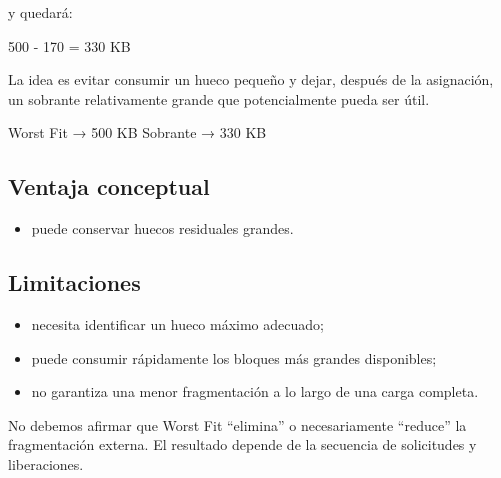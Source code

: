\documentclass[
  spanish,
  letterpaper,
]{scrbook}
\newenvironment{Shaded}{\begin{snugshade}}{\end{snugshade}}
\newcommand{\NormalTok}[1]{\textcolor[rgb]{0.00,0.23,0.31}{#1}}
\providecommand{\tightlist}{%
  \setlength{\itemsep}{0pt}\setlength{\parskip}{0pt}}
\begin{document}
y quedará:

\begin{Shaded}
\begin{Highlighting}[]
\NormalTok{500 {-} 170 = 330 KB}
\end{Highlighting}
\end{Shaded}

La idea es evitar consumir un hueco pequeño y dejar, después de la
asignación, un sobrante relativamente grande que potencialmente pueda
ser útil.

\begin{Shaded}
\begin{Highlighting}[]
\NormalTok{Worst Fit → 500 KB}
\NormalTok{Sobrante  → 330 KB}
\end{Highlighting}
\end{Shaded}

\subsection{Ventaja conceptual}\label{ventaja-conceptual-1}

\begin{itemize}
\tightlist
\item
  puede conservar huecos residuales grandes.
\end{itemize}

\subsection{Limitaciones}\label{limitaciones-4}

\begin{itemize}
\tightlist
\item
  necesita identificar un hueco máximo adecuado;
\item
  puede consumir rápidamente los bloques más grandes disponibles;
\item
  no garantiza una menor fragmentación a lo largo de una carga completa.
\end{itemize}

\begin{tcolorbox}[enhanced jigsaw, arc=.35mm, bottomrule=.15mm, bottomtitle=1mm, breakable, colback=white, colbacktitle=quarto-callout-warning-color!10!white, colframe=quarto-callout-warning-color-frame, coltitle=black, left=2mm, leftrule=.75mm, opacityback=0, opacitybacktitle=0.6, rightrule=.15mm, title=\textcolor{quarto-callout-warning-color}{\faExclamationTriangle}\hspace{0.5em}{Evitemos una conclusión apresurada}, titlerule=0mm, toprule=.15mm, toptitle=1mm]

No debemos afirmar que Worst Fit ``elimina'' o necesariamente ``reduce''
la fragmentación externa. El resultado depende de la secuencia de
solicitudes y liberaciones.

\end{tcolorbox}
\end{document}

